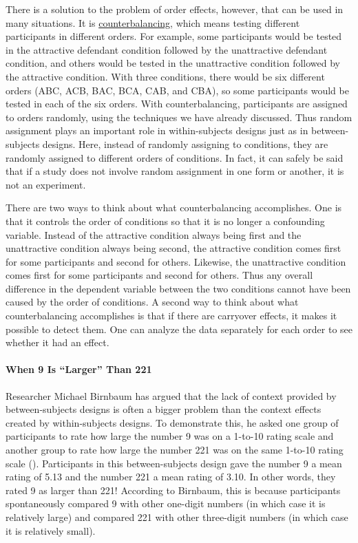\documentclass[
]{krantz}
\begin{document}
There is a solution to the problem of order effects, however, that can be used in many situations. It is \hyperref[counterbalancing]{counterbalancing}, which means testing different participants in different orders. For example, some participants would be tested in the attractive defendant condition followed by the unattractive defendant condition, and others would be tested in the unattractive condition followed by the attractive condition. With three conditions, there would be six different orders (ABC, ACB, BAC, BCA, CAB, and CBA), so some participants would be tested in each of the six orders. With counterbalancing, participants are assigned to orders randomly, using the techniques we have already discussed. Thus random assignment plays an important role in within-subjects designs just as in between-subjects designs. Here, instead of randomly assigning to conditions, they are randomly assigned to different orders of conditions. In fact, it can safely be said that if a study does not involve random assignment in one form or another, it is not an experiment.

There are two ways to think about what counterbalancing accomplishes. One is that it controls the order of conditions so that it is no longer a confounding variable. Instead of the attractive condition always being first and the unattractive condition always being second, the attractive condition comes first for some participants and second for others. Likewise, the unattractive condition comes first for some participants and second for others. Thus any overall difference in the dependent variable between the two conditions cannot have been caused by the order of conditions. A second way to think about what counterbalancing accomplishes is that if there are carryover effects, it makes it possible to detect them. One can analyze the data separately for each order to see whether it had an effect.

\paragraph*{When 9 Is ``Larger'' Than 221}\label{when-9-is-larger-than-221}

Researcher Michael Birnbaum has argued that the lack of context provided by between-subjects designs is often a bigger problem than the context effects created by within-subjects designs. To demonstrate this, he asked one group of participants to rate how large the number 9 was on a 1-to-10 rating scale and another group to rate how large the number 221 was on the same 1-to-10 rating scale (). Participants in this between-subjects design gave the number 9 a mean rating of 5.13 and the number 221 a mean rating of 3.10. In other words, they rated 9 as larger than 221! According to Birnbaum, this is because participants spontaneously compared 9 with other one-digit numbers (in which case it is relatively large) and compared 221 with other three-digit numbers (in which case it is relatively small).
\end{document}
